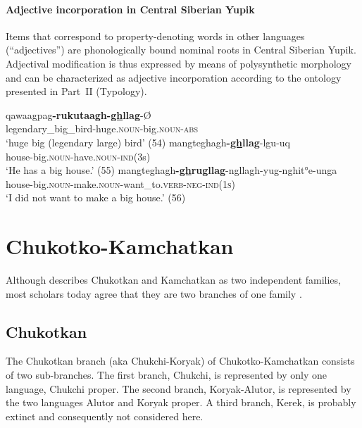 \paragraph*{Adjective incorporation in Central Siberian Yupik}
Items that correspond to property-denoting words in other languages (“adjectives”) are phonologically bound nominal roots in Central Siberian Yupik. Adjectival modification is thus expressed by means of polysynthetic morphology and can be characterized as adjective incorporation according to the ontology presented in Part~II (Typology).
\begin{exe}
\begin{xlist}
\ex
\gll	qawaagpag\textbf{-rukutaagh-\underline{gh}llag}-Ø\\
	legendary\_big\_bird-huge.\textsc{noun}-big.\textsc{noun}-\textsc{abs}\\
\glt	‘huge big (legendary large) bird’ (54)
\ex	
\gll	mangteghagh\textbf{-\underline{gh}llag}-lgu-uq\\
	house-big.\textsc{noun}-have.\textsc{noun}-\textsc{ind}(3s)\\
\glt	‘He has a big house.’ (55)
\ex	
\gll	mangteghagh\textbf{-\underline{gh}rugllag}-ngllagh-yug-nghit°e-unga\\
	house-big.\textsc{noun}-make.\textsc{noun}-want\_to.\textsc{verb}-\textsc{neg}-\textsc{ind(1s)}\\
\glt	‘I did not want to make a big house.’ (56)
\end{xlist}
\end{exe}

\section{Chukotko-Kamchatkan}
Although \citet{salminen2007} describes Chukotkan and Kamchatkan as two independent families, most scholars today agree that they are two branches of one family \citep[see also the comparative dictionary by][]{fortescue2005a}.

\subsection{Chukotkan}
The Chukotkan branch (aka Chukchi-Koryak) of Chukotko-Kamchatkan consists of two sub-branches. The first branch, Chukchi, is represented by only one language, Chukchi proper. The second branch, Koryak-Alutor, is represented by the two languages Alutor and Koryak proper. A third branch, Kerek, is probably extinct \citep[253]{salminen2007} and consequently not considered here.

